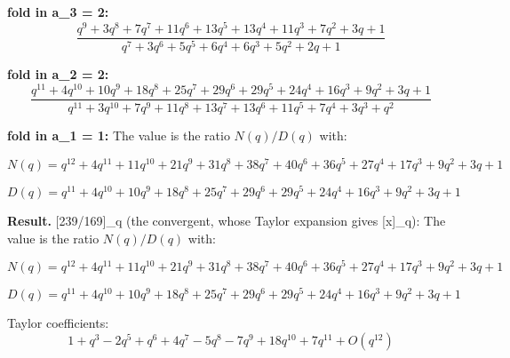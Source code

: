 \documentclass[11pt]{article}
\begin{document}
\noindent\textbf{fold in a\_3 = 2:}
{\footnotesize%
\begin{dmath*}
\frac{q^{9} + 3 q^{8} + 7 q^{7} + 11 q^{6} + 13 q^{5} + 13 q^{4} + 11 q^{3} + 7 q^{2} + 3 q + 1}{q^{7} + 3 q^{6} + 5 q^{5} + 6 q^{4} + 6 q^{3} + 5 q^{2} + 2 q + 1}
\end{dmath*}
}

\noindent\textbf{fold in a\_2 = 2:}
{\footnotesize%
\begin{dmath*}
\frac{q^{11} + 4 q^{10} + 10 q^{9} + 18 q^{8} + 25 q^{7} + 29 q^{6} + 29 q^{5} + 24 q^{4} + 16 q^{3} + 9 q^{2} + 3 q + 1}{q^{11} + 3 q^{10} + 7 q^{9} + 11 q^{8} + 13 q^{7} + 13 q^{6} + 11 q^{5} + 7 q^{4} + 3 q^{3} + q^{2}}
\end{dmath*}
}

\noindent\textbf{fold in a\_1 = 1:}
\noindent The value is the ratio $N(q)/D(q)$ with:\par
{\footnotesize%
\begin{dmath*}
N(q) = q^{12} + 4 q^{11} + 11 q^{10} + 21 q^{9} + 31 q^{8} + 38 q^{7} + 40 q^{6} + 36 q^{5} + 27 q^{4} + 17 q^{3} + 9 q^{2} + 3 q + 1
\end{dmath*}
}

{\footnotesize%
\begin{dmath*}
D(q) = q^{11} + 4 q^{10} + 10 q^{9} + 18 q^{8} + 25 q^{7} + 29 q^{6} + 29 q^{5} + 24 q^{4} + 16 q^{3} + 9 q^{2} + 3 q + 1
\end{dmath*}
}

\noindent\textbf{Result.} [239/169]\_q (the convergent, whose Taylor expansion gives [x]\_q):
\noindent The value is the ratio $N(q)/D(q)$ with:\par
{\footnotesize%
\begin{dmath*}
N(q) = q^{12} + 4 q^{11} + 11 q^{10} + 21 q^{9} + 31 q^{8} + 38 q^{7} + 40 q^{6} + 36 q^{5} + 27 q^{4} + 17 q^{3} + 9 q^{2} + 3 q + 1
\end{dmath*}
}

{\footnotesize%
\begin{dmath*}
D(q) = q^{11} + 4 q^{10} + 10 q^{9} + 18 q^{8} + 25 q^{7} + 29 q^{6} + 29 q^{5} + 24 q^{4} + 16 q^{3} + 9 q^{2} + 3 q + 1
\end{dmath*}
}

\noindent Taylor coefficients:
{\small%
\begin{dmath*}
1 + q^{3} - 2 q^{5} + q^{6} + 4 q^{7} - 5 q^{8} - 7 q^{9} + 18 q^{10} + 7 q^{11} + O(q^{12})
\end{dmath*}
}
\end{document}
